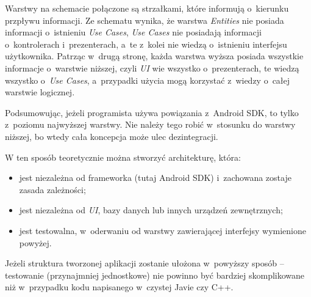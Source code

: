 Warstwy na schemacie połączone są strzałkami, które informują o~kierunku przpływu informacji. Ze schematu wynika, że warstwa \textit{Entities} nie posiada informacji o~istnieniu \textit{Use Cases}, \textit{Use Cases} nie posiadają informacji o~kontrolerach i~prezenterach, a~te z~kolei nie wiedzą o~istnieniu interfejsu użytkownika. Patrząc w~drugą stronę, każda warstwa wyższa posiada wszystkie informacje o~warstwie niższej, czyli \textit{UI} wie wszystko o~prezenterach, te wiedzą wszystko o~\textit{Use Cases}, a~przypadki użycia mogą korzystać z~wiedzy o~całej warstwie logicznej.

Podsumowując, jeżeli programista używa powiązania z~Android SDK, to tylko z~poziomu najwyższej warstwy. Nie należy tego robić w~stosunku do warstwy niższej, bo wtedy cała koncepcja może ulec dezintegracji.

W ten sposób teoretycznie można stworzyć architekturę, która:
\begin{itemize}
\item
jest niezależna od frameworka (tutaj Android SDK) i~zachowana zostaje zasada zależności;
\item
jest niezależna od \textit{UI}, bazy danych lub innych urządzeń zewnętrznych;
\item
jest testowalna, w~oderwaniu od warstwy zawierającej interfejsy wymienione powyżej.
\end{itemize}

Jeżeli struktura tworzonej aplikacji zostanie ułożona w~powyższy sposób – testowanie (przynajmniej jednostkowe) nie powinno być bardziej skomplikowane niż w~przypadku kodu napisanego w~czystej Javie czy C++.
